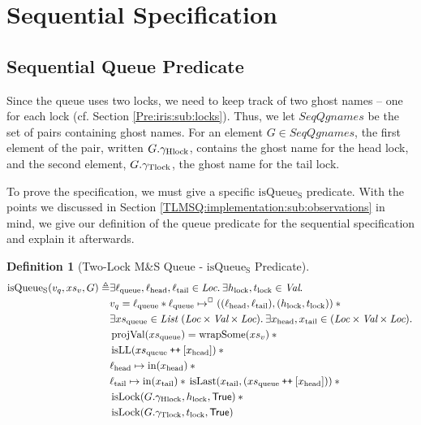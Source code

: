\documentclass[a4paper, 10pt]{report}
\theoremstyle{definition}
\newtheorem{definition}{Definition}[section]
\newcommand{\isLock}{\operatorname{isLock}}
\newcommand{\msq}{M\&S Queue}
\newcommand{\tlmsq}{Two-Lock \msq{}}
\newcommand{\isqueueseq}{\operatorname{isQueue_{S}}}
\newcommand{\SeqQgnames}{SeqQgnames}
\newcommand{\vq}{v_q}
\newcommand{\xsqueue}{xs_{\mathrm{queue}}}
\newcommand{\isLL}{\operatorname{isLL}}
\newcommand{\projval}{\operatorname{projVal}}
\newcommand{\wrapsome}{\operatorname{wrapSome}}
\newcommand{\isLast}{\operatorname{isLast}}
\newcommand{\locN}[1]{\loc_{\mathrm{#1}}}
\newcommand{\lochead}{\locN{head}}
\newcommand{\loctail}{\locN{tail}}
\newcommand{\locqueue}{\locN{queue}}
\newcommand{\nIn}[1]{\operatorname{in}(#1)}
\newcommand{\node}{x}
\newcommand{\nodeN}[1]{\node_{\mathrm{#1}}}
\newcommand{\nodehead}{\nodeN{head}}
\newcommand{\nodetail}{\nodeN{tail}}
\newcommand{\absvalueList}{xs_v}
\newcommand{\Hlock}{h_{\mathrm{lock}}}
\newcommand{\Tlock}{t_{\mathrm{lock}}}
\newcommand{\Qg}{G}
\newcommand{\ghlock}{\gname_{\mathrm{Hlock}}}
\newcommand{\gtlock}{\gname_{\mathrm{Tlock}}}
\newcommand\catenate{\mathbin{\text{\ttfamily\upshape ++}}}
\begin{document}
\section{Sequential Specification}
\label{TLMSQSPECS:section:sequential}

\subsection{Sequential Queue Predicate}
\label{TLMSQSPECS:sequential:sub:seq-queue-pred}

Since the queue uses two locks, we need to keep track of two ghost names -- one for each lock (cf. Section \ref{Pre:iris:sub:locks}). Thus, we let $\SeqQgnames$ be the set of pairs containing ghost names. For an element $\Qg \in \SeqQgnames$, the first element of the pair, written $\Qg.\ghlock$, contains the ghost name for the head lock, and the second element, $\Qg.\gtlock$, the ghost name for the tail lock.

To prove the specification, we must give a specific $\isqueueseq$ predicate. With the points we discussed in Section \ref{TLMSQ:implementation:sub:observations} in mind, we give our definition of the queue predicate for the sequential specification and explain it afterwards.
\begin{definition}[\tlmsq{} - $\isqueueseq$ Predicate]\label{TLMSQ:spec:seq:isqueueseq}
\begin{align*}
  \isqueueseq(\vq, \absvalueList, \Qg) \eqdef
  &\Exists \locqueue, \lochead, \loctail \in \Loc . \Exists \Hlock, \Tlock \in \Val . \\
  &\vq = \locqueue \star{} \locqueue \mapsto^{\persistently} ((\lochead, \loctail), (\Hlock, \Tlock)) \star{}\\
  &\Exists \xsqueue \in \List ~ (\Loc \times \Val \times \Loc) . \Exists \nodehead, \nodetail \in (\Loc \times \Val \times \Loc) .\\
	&\projval(\xsqueue) = \wrapsome(\absvalueList) \star{}\\
	&\isLL (\xsqueue \catenate [\nodehead]) \star{}\\
	&\lochead \mapsto \nIn{\nodehead} \star{}\\
	&\loctail \mapsto \nIn{\nodetail} \star{} \isLast(\nodetail, (\xsqueue \catenate [\nodehead])) \star{}\\
	&\isLock(\Qg.\ghlock, \Hlock, \TRUE) \star{}\\
	&\isLock(\Qg.\gtlock, \Tlock, \TRUE)
\end{align*}
\end{definition}
\end{document}
